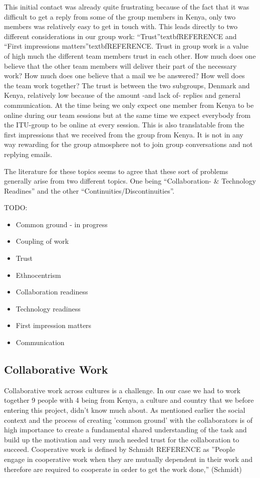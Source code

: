 This initial contact was already quite frustrating because of the fact that it was difficult to get a reply from some of the group members in Kenya, only two members was relatively easy to get in touch with. This leads directly to two different considerations in our group work: ``Trust''textbf{REFERENCE} and ``First impressions matters''textbf{REFERENCE}. Trust in group work is a value of high much the different team members trust in each other. How much does one believe that the other team members will deliver their part of the necessary work? How much does one believe that a mail we be answered? How well does the team work together? The trust is between the two subgroups, Denmark and Kenya, relatively low because of the amount -and lack of- replies and general communication. At the time being we only expect one member from Kenya to be online during our team sessions but at the same time we expect everybody from the ITU-group to be online at every session. This is also translatable from the first impressions that we received from the group from Kenya. It is not in any way rewarding for the group atmosphere not to join group conversations and not replying emails. 

The literature for these topics seems to agree that these sort of problems generally arise from two different topics. One being ``Collaboration- & Technology Readines'' and the other ``Continuities/Discontinuities''. 


TODO:
\begin{itemize}
  \item Common ground - in progress
  \item Coupling of work
  \item Trust
	\item Ethnocentrism
	\item Collaboration readiness
	\item Technology readiness
	\item First impression matters
	\item Communication
\end{itemize}

\subsection{Collaborative Work}
Collaborative work across cultures is a challenge. In our case we had to work together 9 people with 4 being from Kenya, a culture and country that we before entering this project, didn't know much about. As mentioned earlier the social context and the process of creating 'common ground' with the collaborators is of high importance to create a fundamental shared understanding of the task and build up the motivation and very much needed trust for the collaboration to succeed. Cooperative work is defined by Schmidt REFERENCE as ''People engage in cooperative work when they are mutually dependent in their work and therefore are required to cooperate in order to get the work done,'' (Schmidt)

